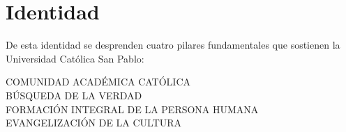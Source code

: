 \section{Identidad}\label{sec:identity}

\begin{quote}
\mission
\end{quote}

De esta identidad se desprenden cuatro pilares fundamentales que sostienen la Universidad Católica San Pablo:

\begin{center}
COMUNIDAD ACADÉMICA CATÓLICA\\
BÚSQUEDA DE LA VERDAD\\
FORMACIÓN INTEGRAL DE LA PERSONA HUMANA\\
EVANGELIZACIÓN DE LA CULTURA
\end{center}